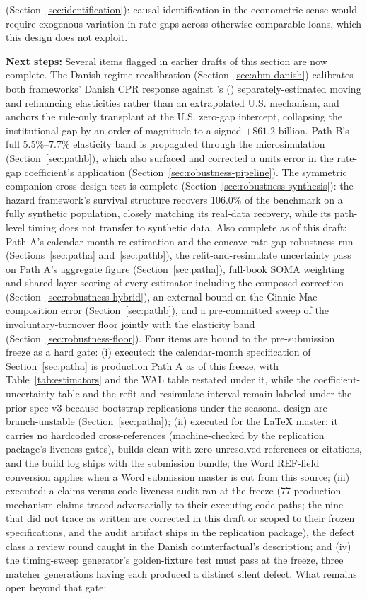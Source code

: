 \documentclass[12pt]{article}
\newcommand{\citepos}[1]{\citeauthor{#1}'s (\citeyear{#1})}
\begin{document}
(Section~\ref{sec:identification}): causal identification in the econometric sense would require exogenous variation in rate gaps across otherwise-comparable loans, which this design does not exploit.

\textbf{Next steps:} Several items flagged in earlier drafts of this section are now complete. The Danish-regime recalibration (Section~\ref{sec:abm-danish}) calibrates both frameworks' Danish CPR response against \citepos{berger2026} separately-estimated moving and refinancing elasticities rather than an extrapolated U.S. mechanism, and anchors the rule-only transplant at the U.S. zero-gap intercept, collapsing the institutional gap by an order of magnitude to a signed $+\$61.2$ billion. Path B's full 5.5\%--7.7\% elasticity band is propagated through the microsimulation (Section~\ref{sec:pathb}), which also surfaced and corrected a units error in the rate-gap coefficient's application (Section~\ref{sec:robustness-pipeline}). The symmetric companion cross-design test is complete (Section~\ref{sec:robustness-synthesis}): the hazard framework's survival structure recovers 106.0\% of the benchmark on a fully synthetic population, closely matching its real-data recovery, while its path-level timing does not transfer to synthetic data. Also complete as of this draft: Path A's calendar-month re-estimation and the concave rate-gap robustness run (Sections~\ref{sec:patha} and~\ref{sec:pathb}), the refit-and-resimulate uncertainty pass on Path A's aggregate figure (Section~\ref{sec:patha}), full-book SOMA weighting and shared-layer scoring of every estimator including the composed correction (Section~\ref{sec:robustness-hybrid}), an external bound on the Ginnie Mae composition error (Section~\ref{sec:pathb}), and a pre-committed sweep of the involuntary-turnover floor jointly with the elasticity band (Section~\ref{sec:robustness-floor}). Four items are bound to the pre-submission freeze as a hard gate: (i) executed: the calendar-month specification of Section~\ref{sec:patha} is production Path A as of this freeze, with Table~\ref{tab:estimators} and the WAL table restated under it, while the coefficient-uncertainty table and the refit-and-resimulate interval remain labeled under the prior spec v3 because bootstrap replications under the seasonal design are branch-unstable (Section~\ref{sec:patha}); (ii) executed for the LaTeX master: it carries no hardcoded cross-references (machine-checked by the replication package's liveness gates), builds clean with zero unresolved references or citations, and the build log ships with the submission bundle; the Word REF-field conversion applies when a Word submission master is cut from this source; (iii) executed: a claims-versus-code liveness audit ran at the freeze (77 production-mechanism claims traced adversarially to their executing code paths; the nine that did not trace as written are corrected in this draft or scoped to their frozen specifications, and the audit artifact ships in the replication package), the defect class a review round caught in the Danish counterfactual's description; and (iv) the timing-sweep generator's golden-fixture test must pass at the freeze, three matcher generations having each produced a distinct silent defect. What remains open beyond that gate: 
\end{document}
